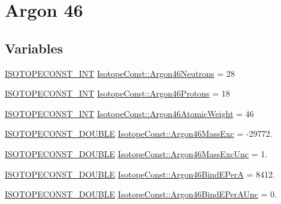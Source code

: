 \hypertarget{group___isotope_const-_argon-_ar46}{}\section{Argon 46}
\label{group___isotope_const-_argon-_ar46}
\subsection*{Variables}
\begin{DoxyCompactItemize}
\item 
\mbox{\hyperlink{group___isotope_const-_macros_ga5f18360b3e99483a35c32d789e62621c}{I\+S\+O\+T\+O\+P\+E\+C\+O\+N\+S\+T\+\_\+\+I\+NT}} \mbox{\hyperlink{group___isotope_const-_argon-_ar46_gae61ef23ba97cb20e512fe8812488b356}{Isotope\+Const\+::\+Argon46\+Neutrons}} = 28
\item 
\mbox{\hyperlink{group___isotope_const-_macros_ga5f18360b3e99483a35c32d789e62621c}{I\+S\+O\+T\+O\+P\+E\+C\+O\+N\+S\+T\+\_\+\+I\+NT}} \mbox{\hyperlink{group___isotope_const-_argon-_ar46_ga40b11f20c995424412ab64a938afde90}{Isotope\+Const\+::\+Argon46\+Protons}} = 18
\item 
\mbox{\hyperlink{group___isotope_const-_macros_ga5f18360b3e99483a35c32d789e62621c}{I\+S\+O\+T\+O\+P\+E\+C\+O\+N\+S\+T\+\_\+\+I\+NT}} \mbox{\hyperlink{group___isotope_const-_argon-_ar46_ga1f5f5754d4d78b645d64697456849c66}{Isotope\+Const\+::\+Argon46\+Atomic\+Weight}} = 46
\item 
\mbox{\hyperlink{group___isotope_const-_macros_ga8f45a7272ce02c0b4c65c44636ed719a}{I\+S\+O\+T\+O\+P\+E\+C\+O\+N\+S\+T\+\_\+\+D\+O\+U\+B\+LE}} \mbox{\hyperlink{group___isotope_const-_argon-_ar46_ga8afa5fbea6757dc46f102deca51192e2}{Isotope\+Const\+::\+Argon46\+Mass\+Exc}} = -\/29772.
\item 
\mbox{\hyperlink{group___isotope_const-_macros_ga8f45a7272ce02c0b4c65c44636ed719a}{I\+S\+O\+T\+O\+P\+E\+C\+O\+N\+S\+T\+\_\+\+D\+O\+U\+B\+LE}} \mbox{\hyperlink{group___isotope_const-_argon-_ar46_gac2401e1780f91c360b873f9777da5436}{Isotope\+Const\+::\+Argon46\+Mass\+Exc\+Unc}} = 1.
\item 
\mbox{\hyperlink{group___isotope_const-_macros_ga8f45a7272ce02c0b4c65c44636ed719a}{I\+S\+O\+T\+O\+P\+E\+C\+O\+N\+S\+T\+\_\+\+D\+O\+U\+B\+LE}} \mbox{\hyperlink{group___isotope_const-_argon-_ar46_ga74d7f41e34476e52972ab96b01cde498}{Isotope\+Const\+::\+Argon46\+Bind\+E\+PerA}} = 8412.
\item 
\mbox{\hyperlink{group___isotope_const-_macros_ga8f45a7272ce02c0b4c65c44636ed719a}{I\+S\+O\+T\+O\+P\+E\+C\+O\+N\+S\+T\+\_\+\+D\+O\+U\+B\+LE}} \mbox{\hyperlink{group___isotope_const-_argon-_ar46_gaa524e093034f11a2d03a850f66f0226e}{Isotope\+Const\+::\+Argon46\+Bind\+E\+Per\+A\+Unc}} = 0.

\end{DoxyCompactItemize}
